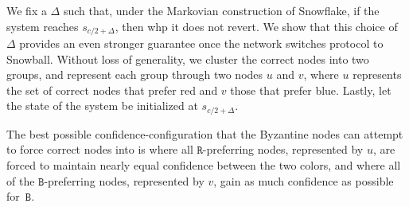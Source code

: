 \documentclass[letterpaper,twocolumn,10pt]{article}
\theoremstyle{definition}
\begin{document}
\begin{appendices}
{We fix a $\Delta$ such that, under the Markovian construction of Snowflake, if the system reaches $s_{c/2 + \Delta}$, then whp it does not revert. We show that this choice of $\Delta$ provides an even stronger guarantee once the network switches protocol to Snowball.
Without loss of generality, we cluster the correct nodes into two groups, and represent each group through two nodes $u$ and $v$, where $u$ represents the set of correct nodes that prefer red and $v$ those that prefer blue. 
Lastly, let the state of the system be initialized at $s_{c/2 + \Delta}$.

The best possible confidence-configuration that the Byzantine nodes can attempt to force correct nodes into is where all $\mathtt{R}$-preferring nodes, represented by $u$, are forced to maintain nearly equal confidence between the two colors, and where all of the $\mathtt{B}$-preferring nodes, represented by $v$, gain as much confidence as possible for~$\mathtt{B}$. 

}
\end{appendices}
\end{document}
